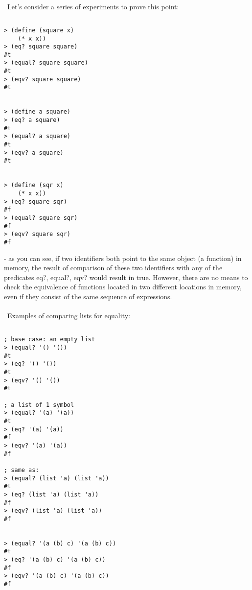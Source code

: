 \documentclass{article}
\begin{document}
\paragraph{}\
Let's consider a series of experiments to prove this point:

\begin{verbatim}

> (define (square x)
    (* x x))
> (eq? square square)
#t
> (equal? square square)
#t
> (eqv? square square)
#t


> (define a square)
> (eq? a square)
#t
> (equal? a square)
#t
> (eqv? a square)
#t


> (define (sqr x)
    (* x x))
> (eq? square sqr)
#f
> (equal? square sqr)
#f
> (eqv? square sqr)
#f
\end{verbatim}
- as you can see, if two identifiers both point to the same object (a function) in memory, the result of comparison of these two identifiers with any of the predicates eq?, equal?, eqv? would result in true. However, there are no means to check the equivalence of functions located in two different locations in memory, even if they consist of the same sequence of expressions.
\paragraph{}\
Examples of comparing lists for equality:
\begin{verbatim} 

; base case: an empty list
> (equal? '() '())
#t
> (eq? '() '())
#t
> (eqv? '() '())
#t 

; a list of 1 symbol
> (equal? '(a) '(a))
#t
> (eq? '(a) '(a))
#f
> (eqv? '(a) '(a))
#f

; same as:
> (equal? (list 'a) (list 'a))
#t
> (eq? (list 'a) (list 'a))
#f
> (eqv? (list 'a) (list 'a))
#f


> (equal? '(a (b) c) '(a (b) c))
#t
> (eq? '(a (b) c) '(a (b) c))
#f
> (eqv? '(a (b) c) '(a (b) c))
#f

\end{verbatim}





\paragraph{}\
\paragraph{}\
\end{document}
